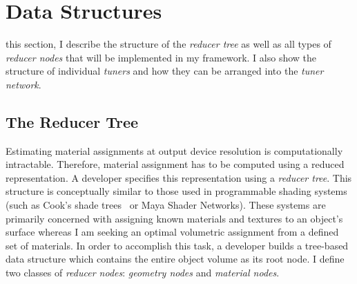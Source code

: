 \chapter{Data Structures}
\label{chap:struct}
 this section, I describe the structure of the \emph{reducer tree} as well as all types of \emph{reducer nodes} that will be implemented in my framework. I also show the structure of individual \emph{tuners} and how they can be arranged into the \emph{tuner network}.

\section{The Reducer Tree}
Estimating material assignments at output device resolution is computationally intractable. Therefore, material assignment has to be computed using a reduced representation. A developer specifies this representation using a \emph{reducer tree}. This structure is conceptually similar to those used in programmable shading systems (such as Cook's shade trees~ or Maya Shader Networks). 
These systems are primarily concerned with assigning known materials and textures to an object's surface whereas I am seeking an optimal volumetric assignment from a defined set of materials. 
In order to accomplish this task, a developer builds a tree-based data structure which contains the entire object volume as its root node. 
I define two classes of \emph{reducer nodes}: \emph{geometry nodes} and \emph{material nodes}.

